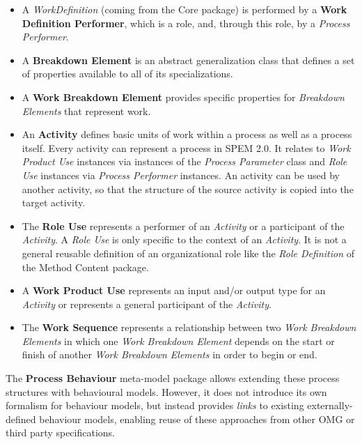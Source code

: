 \begin{itemize}

\item A \textit{WorkDefinition} (coming from the Core package) is performed by a \textbf{Work
Definition Performer}, which is a role, and, through this role, by a \textit{Process Performer}.

\item A \textbf{Breakdown Element} is an abstract generalization class that defines a set of
properties available to all of its specializations.

\item A \textbf{Work Breakdown Element} provides specific properties for \textit{Breakdown Elements}
that represent work.

\item An \textbf{Activity} defines basic units of work within a process as well as a process itself. Every activity can represent a process in SPEM 2.0. It relates to \textit{Work Product Use} instances via instances of the \textit{Process Parameter} class and \textit{Role Use} instances via \textit{Process Performer} instances. An activity can be used by another activity, so that the structure of the source activity is copied into the target activity.

\item The \textbf{Role Use} represents a performer of an \textit{Activity} or a participant of the \textit{Activity}. A \textit{Role Use} is only specific to the context of an \textit{Activity}. It is not a general reusable definition of an organizational role like the \textit{Role Definition} of the Method Content package. 

\item A \textbf{Work Product Use} represents an input and/or output type for an \textit{Activity} or
represents a general participant of the \textit{Activity}.

\item The \textbf{Work Sequence} represents a relationship between two \textit{Work Breakdown Elements} in which one \textit{Work Breakdown Element} depends on the start or finish of another \textit{Work Breakdown Elements} in order to begin or end.

\end{itemize}

The \textbf{Process Behaviour} meta-model package allows extending these process structures with
behavioural models. However, it does not introduce its own formalism for behaviour models, but instead provides \textit{links} to existing externally-defined behaviour models, enabling reuse of these approaches from other OMG or third party specifications.

